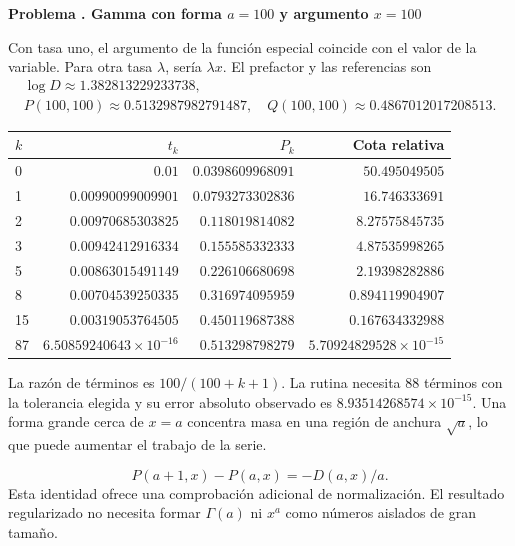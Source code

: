 \documentclass[11pt,a4paper]{article}
\theoremstyle{definition}
\newcounter{problema}
\newenvironment{resuelto}[1]{\refstepcounter{problema}\par\medskip\Needspace{6\baselineskip}\textbf{Problema \theproblema. #1}\par}{\par\medskip}
\begin{document}
\begin{resuelto}{Gamma con forma $a=100$ y argumento $x=100$}
Con tasa uno, el argumento de la función especial coincide con el valor de la variable. Para otra tasa $\lambda$, sería $\lambda x$. El prefactor y las referencias son
\[
\begin{gathered}
\log D\approx1.382813229233738,\\
P(100,100)\approx0.5132987982791487,\quad Q(100,100)\approx0.4867012017208513.
\end{gathered}
\]

\begin{center}\small\begin{tabular}{lrrr}
\toprule
$k$ & $t_k$ & $P_k$ & Cota relativa\\\midrule
0 & $0.01$ & $0.0398609968091$ & $50.495049505$\\
1 & $0.00990099009901$ & $0.0793273302836$ & $16.746333691$\\
2 & $0.00970685303825$ & $0.118019814082$ & $8.27575845735$\\
3 & $0.00942412916334$ & $0.155585332333$ & $4.87535998265$\\
5 & $0.00863015491149$ & $0.226106680698$ & $2.19398282886$\\
8 & $0.00704539250335$ & $0.316974095959$ & $0.894119904907$\\
15 & $0.00319053764505$ & $0.450119687388$ & $0.167634332988$\\
87 & $6.50859240643\times10^{-16}$ & $0.513298798279$ & $5.70924829528\times10^{-15}$\\
\bottomrule\end{tabular}\end{center}

La razón de términos es $100/(100+k+1)$. La rutina necesita 88 términos con la tolerancia elegida y su error absoluto observado es $8.93514268574\times10^{-15}$. Una forma grande cerca de $x=a$ concentra masa en una región de anchura $\sqrt a$, lo que puede aumentar el trabajo de la serie.

\[
P(a+1,x)-P(a,x)=-D(a,x)/a.
\]
Esta identidad ofrece una comprobación adicional de normalización. El resultado regularizado no necesita formar $\Gamma(a)$ ni $x^a$ como números aislados de gran tamaño.
\end{resuelto}
\end{document}
